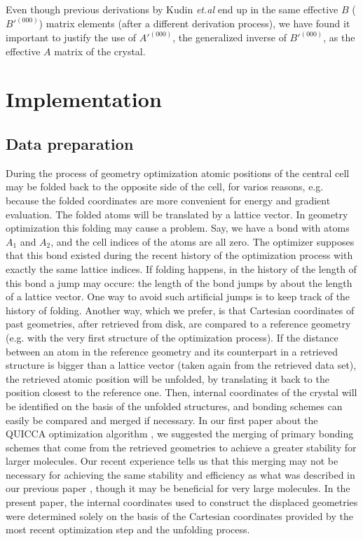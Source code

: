 \documentclass[prl,aps,preprint,superbib,12pt]{revtex4}
\begin{document}
Even though previous derivations by Kudin {\it et.al} \cite{KKudin01} 
end up in the same
effective $B$ ($B'^{(000)}$) matrix elements
(after a different derivation process),
we have found it important to justify the use of
$A'^{(000)}$, the generalized inverse of $B'^{(000)}$, as
the effective $A$ matrix of the crystal.

\section{Implementation}

\subsection{Data preparation}
During the process of geometry optimization atomic positions
of the central cell may be folded back to the opposite side of the 
cell, for varios reasons, e.g. because the folded coordinates 
are more convenient for energy and gradient evaluation. The folded
atoms will be translated by a lattice vector.
In geometry optimization this folding may cause a problem. 
Say, we have a 
bond with atoms $A_{1}$ and $A_{2}$, and the cell indices of the
atoms are all zero. The optimizer supposes that this bond existed
during the recent history of the optimization process with exactly
the same lattice indices. If folding happens, in the history
of the length of this bond a jump may occure: the length of the
bond jumps by about the length of a lattice vector. 
One way to avoid such artificial jumps is to keep track
of the history of folding. Another way, which we prefer, is
that Cartesian coordinates of past geometries, after retrieved from 
disk, are compared to a reference geometry (e.g. with the     
very first structure of the optimization process). If the
distance between an atom in the reference geometry and its counterpart
in a retrieved structure is bigger than a lattice vector 
(taken again from the retrieved data set), the retrieved
atomic position will be unfolded, by translating it back 
to the position closest to the reference one.
Then, internal coordinates of the crystal will be identified on the
basis of the unfolded structures, and bonding schemes can easily
be compared and merged if necessary.
In our first paper about the QUICCA optimization algorithm 
\cite{KNemeth04}, we suggested the merging of primary
bonding schemes that come from the retrieved geometries to achieve
a greater stability for larger molecules. Our recent experience tells
us that this merging may not be necessary for achieving
the same stability and efficiency as what was described in our
previous paper \cite{KNemeth04}, though it may be beneficial
for very large molecules. In the present paper,
the internal coordinates used to construct the displaced geometries
were determined solely on the basis of the Cartesian coordinates
provided by the most recent optimization step and the unfolding 
process.
\end{document}
